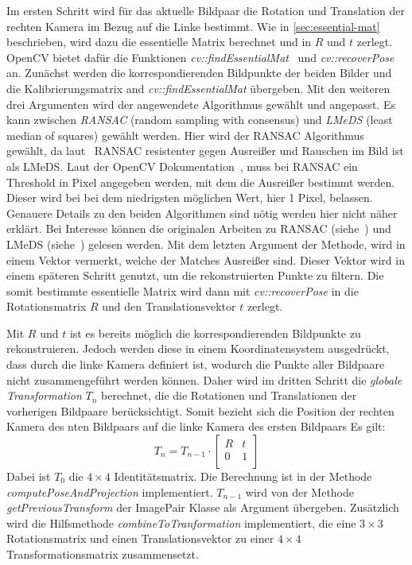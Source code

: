 Im ersten Schritt wird für das aktuelle Bildpaar die Rotation und Translation der rechten Kamera im Bezug auf die Linke bestimmt.
Wie in \cref{sec:essential-mat} beschrieben, wird dazu die essentielle Matrix berechnet und in $R$ und $t$ zerlegt.
OpenCV bietet dafür die Funktionen \emph{cv::findEssentialMat}~\cite{opencv_doc_essential_matrix} und \emph{cv::recoverPose}~\cite{opencv_doc_recover_pose} an.
Zunächst werden die korrespondierenden Bildpunkte der beiden Bilder und die Kalibrierungsmatrix and \emph{cv::findEssentialMat} übergeben.
Mit den weiteren drei Argumenten wird der angewendete Algorithmus gewählt und angepasst.
Es kann zwischen \emph{RANSAC} (random sampling with consensus) und \emph{LMeDS} (least median of squares) gewählt werden.
Hier wird der RANSAC Algorithmus gewählt, da laut~\cite[Kapitel 18, 664]{kaehler_2016} RANSAC resistenter gegen Ausreißer und Rauschen im Bild ist als LMeDS. %
Laut der OpenCV Dokumentation~\cite{opencv_doc_essential_matrix}, muss bei RANSAC ein Threshold in Pixel angegeben werden, mit dem die Ausreißer bestimmt werden.
Dieser wird bei bei dem niedrigsten möglichen Wert, hier 1 Pixel, belassen.
Genauere Details zu den beiden Algorithmen sind nötig werden hier nicht näher erklärt.
Bei Interesse können die originalen Arbeiten zu RANSAC (siehe~\cite{fischler_81}) und LMeDS (siehe~\cite{inui_03}) gelesen werden.
Mit dem letzten Argument der Methode, wird in einem Vektor vermerkt, welche der Matches Ausreißer sind.
Dieser Vektor wird in einem späteren Schritt genutzt, um die rekonstruierten Punkte zu filtern.
Die somit bestimmte essentielle Matrix wird dann mit \emph{cv::recoverPose} in die Rotationsmatrix $R$ und den Translationsvektor $t$ zerlegt.

Mit $R$ und $t$ ist es bereits möglich die korrespondierenden Bildpunkte zu rekonstruieren.
Jedoch werden diese in einem Koordinatensystem ausgedrückt, dass durch die linke Kamera definiert ist, wodurch die Punkte aller Bildpaare nicht zusammengeführt werden können.
Daher wird im dritten Schritt die \emph{globale Transformation} $T_n$ berechnet, die die Rotationen und Translationen der vorherigen Bildpaare berücksichtigt.
Somit bezieht sich die Position der rechten Kamera des nten Bildpaars auf die linke Kamera des ersten Bildpaars 
Es gilt:
\[ T_n = T_{n-1} \cdot \begin{bmatrix}
            R & t \\
            0 & 1 \\
        \end{bmatrix}
    \] 
Dabei ist $T_0$ die $4 \times 4$ Identitätsmatrix.
Die Berechnung ist in der Methode \emph{computePoseAndProjection} implementiert.
$T_{n-1}$ wird von der Methode \emph{getPreviousTransform} der ImagePair Klasse als Argument übergeben. %
Zusätzlich wird die Hilfsmethode \emph{combineToTranformation} implementiert, die eine $3\times3$ Rotationsmatrix und einen Translationsvektor zu einer $4\times4$ Transformationsmatrix zusammensetzt.

